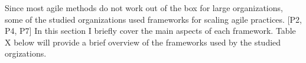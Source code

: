 Since most agile methods do not work out of the box for large
organizations, some of the studied organizations used frameworks for
scaling agile practices. [P2, P4, P7] In this section I briefly cover
the main aspects of each framework. Table X below will provide a brief overview
of the frameworks used by the studied orgizations.

\bigskip

\bigskip
